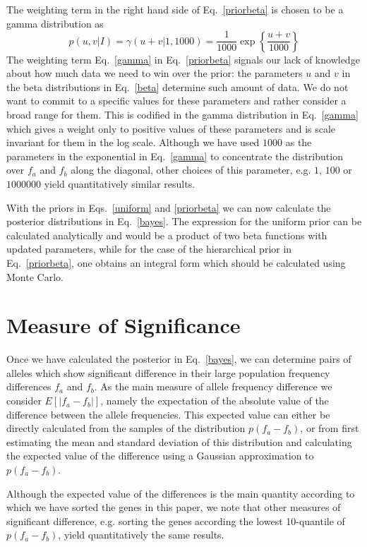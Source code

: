 \documentclass[12pt]{iopart}
\begin{document}
The weighting term in the right hand side of Eq.\ \ref{priorbeta} is chosen to be a gamma distribution as
\begin{equation}
p(u,v\vert I) = \gamma(u+v \vert 1, 1000) = \frac{1}{1000} \exp\left \{ \frac{u+v}{1000}\right \}
\label{gamma}
\end{equation}
The weighting term Eq.\ \ref{gamma} in Eq.\ \ref{priorbeta} signals our lack of knowledge about how much data we need to win over the prior: the parameters $u$ and $v$ in the beta 
distributions in Eq.\ \ref{beta} determine such amount of data. We do not want to commit to a specific values for these parameters and rather consider a broad range for them. This is codified in the gamma distribution in Eq.\ \ref{gamma} which gives a weight only to positive values of these parameters and is scale invariant for them in the log scale. Although we have used $1000$ as the parameters in the exponential in Eq.\ \ref{gamma} to concentrate the distribution over $f_a$ and $f_b$ along the diagonal, other choices of
this parameter, e.g. $1$, $100$ or $1000000$ yield quantitatively similar results. 
 
With the priors in Eqs.\ \ref{uniform} and \ref{priorbeta} we can now calculate the posterior distributions in Eq.\ \ref{bayes}. The expression for the uniform prior can be calculated analytically and would be a product of two beta functions with updated parameters, while for the case of the hierarchical prior in Eq.\ \ref{priorbeta}, one obtains an integral form 
which should be calculated using Monte Carlo.  

\section{Measure of Significance}
Once we have calculated the posterior in Eq.\ \ref{bayes}, we can determine pairs of alleles which show significant difference in their large population frequency differences $f_a$ and $f_b$.  As the main measure of allele frequency difference we consider $E[\vert f_a-f_b \vert]$, namely the expectation of the absolute value of the difference between the allele frequencies. This expected value can either be directly calculated from the samples of the distribution $p(f_a-f_b)$, or from first estimating the mean and standard deviation of this distribution and calculating the expected value of the difference using a Gaussian approximation to $p(f_a-f_b)$. 

Although the expected value of the differences is the main quantity according to which we have sorted the genes in this paper, we note that other measures of significant difference, e.g. 
sorting the genes according the lowest 10-quantile of $p(f_a-f_b)$, yield quantitatively the same results. 
 


\end{document}
